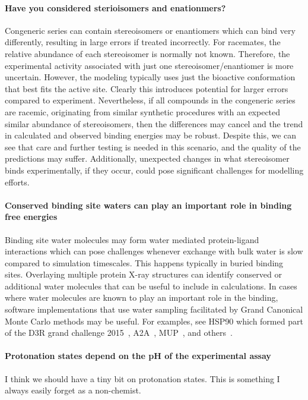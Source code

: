 \documentclass[9pt,bestpractices]{livecoms}
\begin{document}
\paragraph{Have you considered sterioisomers and enationmers?}
Congeneric series can contain stereoisomers or enantiomers which can bind very differently, resulting in large errors if treated incorrectly. For racemates, the relative abundance of each stereoisomer is normally not known. Therefore, the experimental activity associated with just one stereoisomer/enantiomer is more uncertain. However, the modeling typically uses just the bioactive conformation that best fits the active site. Clearly this introduces potential for larger errors compared to experiment. Nevertheless, if all compounds in the congeneric series are racemic, originating from similar synthetic procedures with an expected similar abundance of stereoisomers, then the differences may cancel and the trend in calculated and observed binding energies may be robust. Despite this, we can see that care and further testing is needed in this scenario, and the quality of the predictions may suffer. Additionally, unexpected changes in what stereoisomer binds experimentally, if they occur, could pose significant challenges for modelling efforts.

\paragraph{Conserved binding site waters can play an important role in binding free energies}
Binding site water molecules may form water mediated protein-ligand interactions which can pose challenges whenever exchange with bulk water is slow compared to simulation timescales. This happens typically in buried binding sites. Overlaying multiple protein X-ray structures can identify conserved or additional water molecules that can be useful to include in calculations. In cases where water molecules are known to play an important role in the binding, software implementations that use water sampling facilitated by Grand Canonical Monte Carlo methods may be useful. For examples, see HSP90 which formed part of the D3R grand challenge 2015~\cite{mey2016blinded}, A2A~\cite{brucemacdonald2018ligand}, MUP~\cite{ross2015water}, and others~\cite{michel2009energetics}.

\paragraph{Protonation states depend on the pH of the experimental assay}
I think we should have a tiny bit on protonation states. This is something I always easily forget as a non-chemist. 
\end{document}
